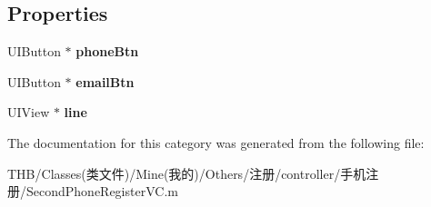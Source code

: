 \subsection*{Properties}
\begin{DoxyCompactItemize}
\item 
\mbox{\label{category_second_phone_register_v_c_07_08_a7f82144bf0ff20292a4451414a2508c4}} 
U\+I\+Button $\ast$ {\bfseries phone\+Btn}
\item 
\mbox{\label{category_second_phone_register_v_c_07_08_a7daff7ea05dd025961d51b9cb5a19470}} 
U\+I\+Button $\ast$ {\bfseries email\+Btn}
\item 
\mbox{\label{category_second_phone_register_v_c_07_08_a96a9fa73e8ee4ebb89cfecac4efebb61}} 
U\+I\+View $\ast$ {\bfseries line}
\end{DoxyCompactItemize}


The documentation for this category was generated from the following file\+:\begin{DoxyCompactItemize}
\item 
T\+H\+B/\+Classes(类文件)/\+Mine(我的)/\+Others/注册/controller/手机注册/Second\+Phone\+Register\+V\+C.\+m\end{DoxyCompactItemize}

